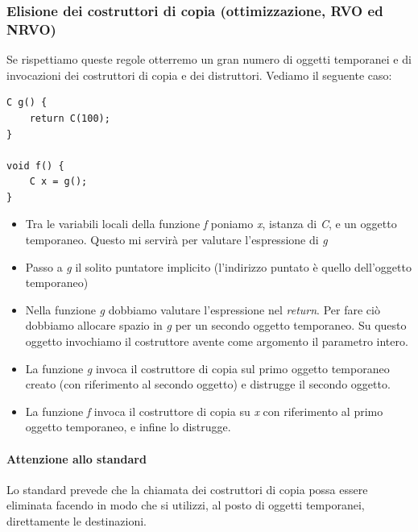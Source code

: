 \documentclass[11pt]{report}
\theoremstyle{definition}
\begin{document}
\subsubsection{Elisione dei costruttori di copia (ottimizzazione, RVO ed NRVO)} 
Se rispettiamo queste regole otterremo un gran numero di oggetti temporanei e di invocazioni dei costruttori di copia e dei distruttori. Vediamo il seguente caso:
\begin{verbatim}
C g() {
    return C(100);
}

void f() {
    C x = g();
}
\end{verbatim}
\begin{itemize}
\item Tra le variabili locali della funzione \emph{f} poniamo \emph{x}, istanza di \emph{C}, e un oggetto temporaneo. Questo mi servirà per valutare l'espressione di \emph{g}
\item Passo a \emph{g} il solito puntatore implicito (l'indirizzo puntato è quello dell'oggetto temporaneo)
\item Nella funzione \emph{g} dobbiamo valutare l'espressione nel \emph{return}. Per fare ciò dobbiamo allocare spazio in \emph{g} per un secondo oggetto temporaneo. Su questo oggetto invochiamo il costruttore avente come argomento il parametro intero.
\item La funzione \emph{g} invoca il costruttore di copia sul primo oggetto temporaneo creato (con riferimento al secondo oggetto) e distrugge il secondo oggetto.
\item La funzione \emph{f} invoca il costruttore di copia su \emph{x} con riferimento al primo oggetto temporaneo, e infine lo distrugge.
\end{itemize}
\paragraph{Attenzione allo standard} Lo standard prevede che la chiamata dei costruttori di copia possa essere eliminata facendo in modo che si utilizzi, al posto di oggetti temporanei, direttamente le destinazioni. 
\end{document}
